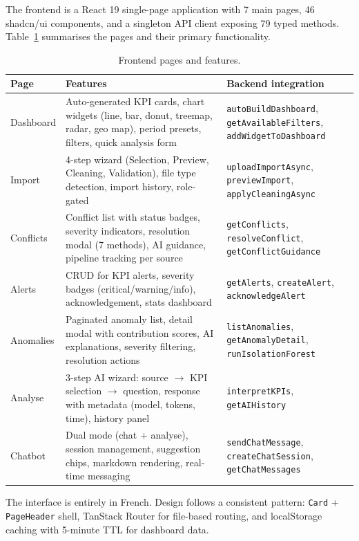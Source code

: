 \noindent
The frontend is a React 19 single-page application
with 7 main pages,
46 shadcn/ui components,
and a singleton API client
exposing 79 typed methods.
Table~\ref{tab:frontend} summarises the pages
and their primary functionality.

\begin{table}[h!]
\centering
\caption{Frontend pages and features.}
\label{tab:frontend}
\small
\renewcommand{\arraystretch}{1.3}
\begin{tabular}{|l|p{5.5cm}|p{4.5cm}|}
\hline
\textbf{Page} & \textbf{Features} & \textbf{Backend integration} \\
\hline
Dashboard & Auto-generated KPI cards, chart widgets (line, bar, donut, treemap, radar, geo map), period presets, filters, quick analysis form & \texttt{autoBuildDashboard}, \texttt{getAvailableFilters}, \texttt{addWidgetToDashboard} \\
\hline
Import & 4-step wizard (Selection, Preview, Cleaning, Validation), file type detection, import history, role-gated & \texttt{uploadImportAsync}, \texttt{previewImport}, \texttt{applyCleaningAsync} \\
\hline
Conflicts & Conflict list with status badges, severity indicators, resolution modal (7 methods), AI guidance, pipeline tracking per source & \texttt{getConflicts}, \texttt{resolveConflict}, \texttt{getConflictGuidance} \\
\hline
Alerts & CRUD for KPI alerts, severity badges (critical/warning/info), acknowledgement, stats dashboard & \texttt{getAlerts}, \texttt{createAlert}, \texttt{acknowledgeAlert} \\
\hline
Anomalies & Paginated anomaly list, detail modal with contribution scores, AI explanations, severity filtering, resolution actions & \texttt{listAnomalies}, \texttt{getAnomalyDetail}, \texttt{runIsolationForest} \\
\hline
Analyse & 3-step AI wizard: source $\rightarrow$ KPI selection $\rightarrow$ question, response with metadata (model, tokens, time), history panel & \texttt{interpretKPIs}, \texttt{getAIHistory} \\
\hline
Chatbot & Dual mode (chat + analyse), session management, suggestion chips, markdown rendering, real-time messaging & \texttt{sendChatMessage}, \texttt{createChatSession}, \texttt{getChatMessages} \\
\hline
\end{tabular}
\end{table}

\noindent
The interface is entirely in French.
Design follows a consistent pattern:
\texttt{Card} + \texttt{PageHeader} shell,
TanStack Router for file-based routing,
and localStorage caching with 5-minute TTL
for dashboard data.


